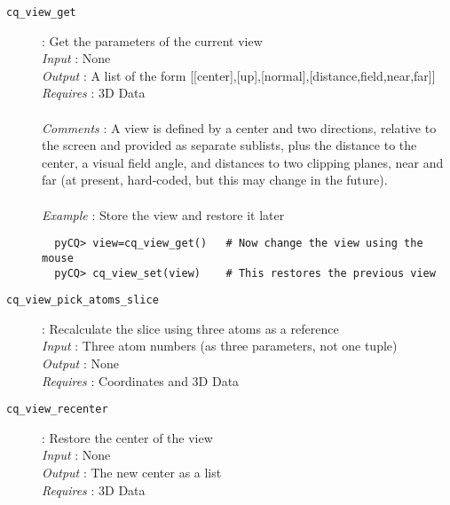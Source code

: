 \documentclass[a4paper,notitlepage,11pt]{article}
\begin{document}
\begin{description}
\item[\texttt{cq\_view\_get}]: Get the parameters of the current view \\
  \emph{Input} : None\\
  \emph{Output} : A list of the form [[center],[up],[normal],[distance,field,near,far]]\\
  \emph{Requires} : 3D Data\\
  \\
  \emph{Comments} : A view is defined by a center and two directions, relative to the screen and provided as separate sublists,
  plus the distance to the center, a visual field angle, and distances to two clipping planes, near and far
  (at present, hard-coded, but this may change in the future).\\
  \\
  \emph{Example} : Store the view and restore it later
  \begin{verbatim}
  pyCQ> view=cq_view_get()   # Now change the view using the mouse
  pyCQ> cq_view_set(view)    # This restores the previous view
  \end{verbatim}
\end{description}
 
\begin{description}
\item[\texttt{cq\_view\_pick\_atoms\_slice}]: Recalculate the slice using three atoms as a reference\\
  \emph{Input} : Three atom numbers (as three parameters,  not one tuple)\\
  \emph{Output} : None\\
  \emph{Requires} : Coordinates and 3D Data\\
\end{description}

\begin{description}
\item[\texttt{cq\_view\_recenter}]: Restore the center of the view \\
  \emph{Input} : None\\
  \emph{Output} : The new center as a list\\
  \emph{Requires} : 3D Data\\
\end{description}
\end{document}
